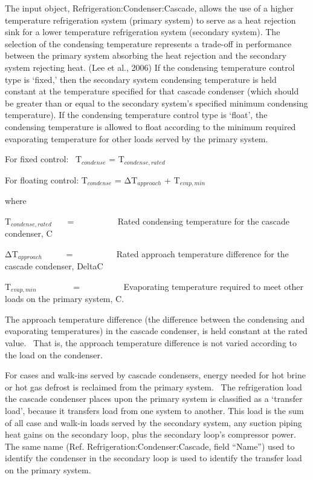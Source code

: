 The input object, Refrigeration:Condenser:Cascade, allows the use of a higher temperature refrigeration system (primary system) to serve as a heat rejection sink for a lower temperature refrigeration system (secondary system). The selection of the condensing temperature represents a trade-off in performance between the primary system absorbing the heat rejection and the secondary system rejecting heat. (Lee et al., 2006) If the condensing temperature control type is `fixed,' then the secondary system condensing temperature is held constant at the temperature specified for that cascade condenser (which should be greater than or equal to the secondary system's specified minimum condensing temperature). If the condensing temperature control type is `float', the condensing temperature is allowed to float according to the minimum required evaporating temperature for other loads served by the primary system.

For fixed control:~ T\(_{condense}\) = T\(_{condense,rated}\)

For floating control: T\(_{condense}\) = ΔT\(_{approach}\) + T\(_{evap,min}\)

where

T\(_{condense,rated}\)~~~ = ~~~~~~~~~ Rated condensing temperature for the cascade condenser, C

ΔT\(_{approach}\)~~~~~ = ~~~~~~~~~ Rated approach temperature difference for the cascade condenser, DeltaC

T\(_{evap,min}\)~~~~~~~~ = ~~~~~~~~~ Evaporating temperature required to meet other loads on the primary system, C.

The approach temperature difference (the difference between the condensing and evaporating temperatures) in the cascade condenser, is held constant at the rated value.~ That is, the approach temperature difference is not varied according to the load on the condenser.

For cases and walk-ins served by cascade condensers, energy needed for hot brine or hot gas defrost is reclaimed from the primary system.~ The refrigeration load the cascade condenser places upon the primary system is classified as a `transfer load', because it transfers load from one system to another. This load is the sum of all case and walk-in loads served by the secondary system, any suction piping heat gains on the secondary loop, plus the secondary loop's compressor power. The same name (Ref. Refrigeration:Condenser:Cascade, field ``Name'') used to identify the condenser in the secondary loop is used to identify the transfer load on the primary system.


